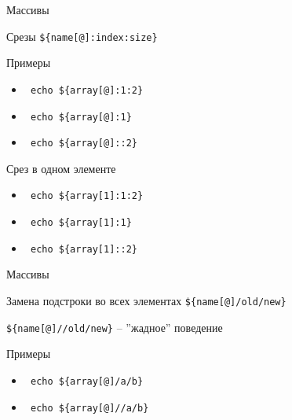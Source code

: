 \begin{frame}[fragile]{Массивы}
	\begin{block}{Срезы}
		{\tt \$\{name[@]:index:size\}}
	\end{block}

	\begin{block}{Примеры}
		\begin{itemize}
			\item \verb+ echo ${array[@]:1:2} +
			\item \verb+ echo ${array[@]:1} +
			\item \verb+ echo ${array[@]::2} +
		\end{itemize}
	\end{block}

	\pause

	\begin{alertblock}{Срез в одном элементе}
		\begin{itemize}
			\item \verb+ echo ${array[1]:1:2} +
			\item \verb+ echo ${array[1]:1} +
			\item \verb+ echo ${array[1]::2} +
		\end{itemize}

	\end{alertblock}

\end{frame}

\begin{frame}[fragile]{Массивы}
	\begin{block}{Замена подстроки во всех элементах}
		{\tt \$\{name[@]/old/new\}}

		{\tt \$\{name[@]//old/new\}} -- ''жадное'' поведение
	\end{block}

	\begin{block}{Примеры}
		\begin{itemize}
			\item \verb+ echo ${array[@]/a/b} +
			\item \verb+ echo ${array[@]//a/b} +
		\end{itemize}
	\end{block}

\end{frame}

